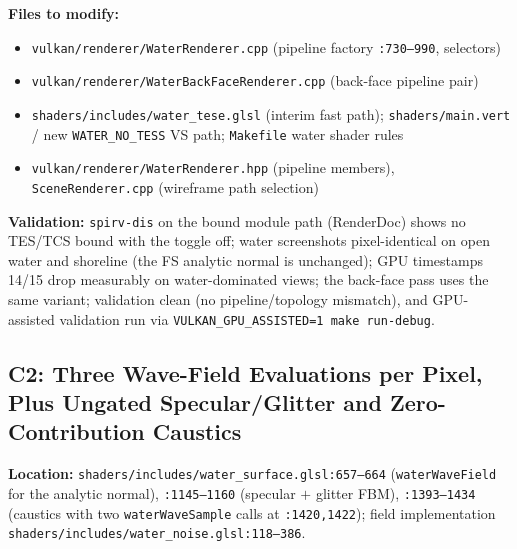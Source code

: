 \documentclass[11pt,a4paper]{article}
\begin{document}
\begin{tcolorbox}[promptbox={Prompt: Remove the Tessellation Stages When Tessellation Is Off}]
\textbf{Files to modify:}
\begin{itemize}
    \item \texttt{vulkan/renderer/WaterRenderer.cpp} (pipeline factory \texttt{:730--990}, selectors)
    \item \texttt{vulkan/renderer/WaterBackFaceRenderer.cpp} (back-face pipeline pair)
    \item \texttt{shaders/includes/water\_tese.glsl} (interim fast path); \texttt{shaders/main.vert} / new \texttt{WATER\_NO\_TESS} VS path; \texttt{Makefile} water shader rules
    \item \texttt{vulkan/renderer/WaterRenderer.hpp} (pipeline members), \texttt{SceneRenderer.cpp} (wireframe path selection)
\end{itemize}

\textbf{Validation:} \texttt{spirv-dis} on the bound module path (RenderDoc) shows no TES/TCS bound with the toggle off; water screenshots pixel-identical on open water and
shoreline (the FS analytic normal is unchanged); GPU timestamps 14/15 drop measurably on water-dominated views; the back-face pass uses the same variant; validation clean
(no pipeline/topology mismatch), and GPU-assisted validation run via \texttt{VULKAN\_GPU\_ASSISTED=1 make run-debug}.
\end{tcolorbox}

\subsection{C2: Three Wave-Field Evaluations per Pixel, Plus Ungated Specular/Glitter and Zero-Contribution Caustics}

\textbf{Location:} \texttt{shaders/includes/water\_surface.glsl:657--664} (\texttt{waterWaveField} for the analytic normal), \texttt{:1145--1160}
(specular $+$ glitter FBM), \texttt{:1393--1434} (caustics with two \texttt{waterWaveSample} calls at \texttt{:1420,1422}); field implementation
\texttt{shaders/includes/water\_noise.glsl:118--386}.
\end{document}
